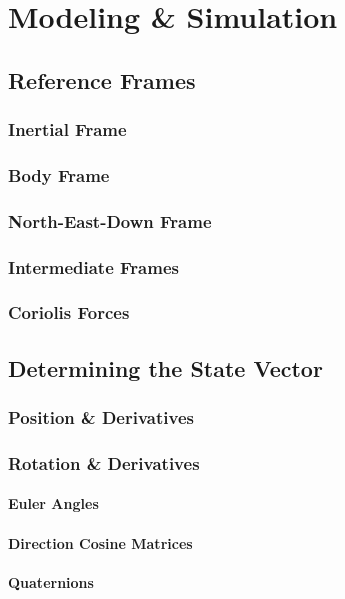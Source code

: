 \documentclass[../notes.tex]{subfiles}
\begin{document}
\section{Modeling \& Simulation}
\subsection{Reference Frames}
\subsubsection{Inertial Frame}
\subsubsection{Body Frame}
\subsubsection{North-East-Down Frame}
\subsubsection{Intermediate Frames}
\subsubsection{Coriolis Forces} \label{sec:coriolis}

\subsection{Determining the State Vector}
\subsubsection{Position \& Derivatives}
\subsubsection{Rotation \& Derivatives}
\paragraph{Euler Angles}
\paragraph{Direction Cosine Matrices}
\paragraph{Quaternions}
\end{document}

